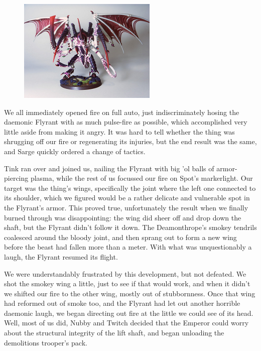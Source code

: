 \begin{figure}
	\begin{center}
		\includegraphics[width=\figwidth]{pics/15/67.png}
	\end{center}
\end{figure}
We all immediately opened fire on full auto, just indiscriminately hosing the daemonic Flyrant with as much pulse-fire as possible, which accomplished very little aside from making it angry. 
It was hard to tell whether the thing was shrugging off our fire or regenerating its injuries, but the end result was the same, and Sarge quickly ordered a change of tactics. 


Tink ran over and joined us, nailing the Flyrant with big 'ol balls of armor-piercing plasma, while the rest of us focussed our fire on Spot's markerlight. 
Our target was the thing's wings, specifically the joint where the left one connected to its shoulder, which we figured would be a rather delicate and vulnerable spot in the Flyrant's armor. 
This proved true, unfortunately the result when we finally burned through was disappointing: 
the wing did sheer off and drop down the shaft, but the Flyrant didn't follow it down. 
The Deamonthrope's smokey tendrils coalesced around the bloody joint, and then sprang out to form a new wing before the beast had fallen more than a meter. 
With what was unquestionably a laugh, the Flyrant resumed its flight.

We were understandably frustrated by this development, but not defeated. 
We shot the smokey wing a little, just to see if that would work, and when it didn't we shifted our fire to the other wing, mostly out of stubbornness. 
Once that wing had reformed out of smoke too, and the Flyrant had let out another horrible daemonic laugh, we began directing out fire at the little we could see of its head. 
Well, most of us did, Nubby and Twitch decided that the Emperor could worry about the structural integrity of the lift shaft, and began unloading the demolitions trooper's pack.

